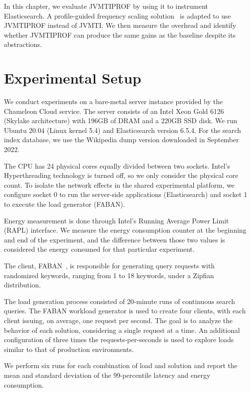 \label{cap:evaluation}

In this chapter, we evaluate JVMTIPROF by using it to instrument Elasticsearch. A profile-guided frequency scaling solution~\cite{hurryupccgrid} is adapted to use JVMTIPROF instead of JVMTI. We then measure the overhead and identify whether JVMTIPROF can produce the same gains as the baseline despite its abstractions.

\section{Experimental Setup}

We conduct experiments on a bare-metal server instance provided by the Chameleon Cloud service. The server consists of an Intel Xeon Gold 6126 (Skylake architecture) with 196GB of DRAM and a 220GB SSD disk. We run Ubuntu 20.04 (Linux kernel 5.4) and Elasticsearch version 6.5.4. For the search index database, we use the Wikipedia dump version  downloaded in September 2022.

The CPU has 24 physical cores equally divided between two sockets. Intel's Hyperthreading technology is turned off, so we only consider the physical core count. To isolate the network effects in the shared experimental platform, we configure socket 0 to run the server-side applications (Elasticsearch) and socket 1 to execute the load generator (FABAN).

Energy measurement is done through Intel's Running Average Power Limit (RAPL) interface. We measure the energy consumption counter at the beginning and end of the experiment, and the difference between those two values is considered the energy consumed for that particular experiment.

The client, FABAN~\cite{faban}, is responsible for generating query requests with randomized keywords, ranging from 1 to 18 keywords, under a Zipfian distribution.

The load generation process consisted of 20-minute runs of continuous search queries. The FABAN workload generator is used to create four clients, with each client issuing, on average, one request per second. The goal is to analyze the behavior of each solution, considering a single request at a time. An additional configuration of three times the requests-per-seconds is used to explore loads similar to that of production environments.

We perform six runs for each combination of load and solution and report the mean and standard deviation of the 99-percentile latency and energy consumption.

